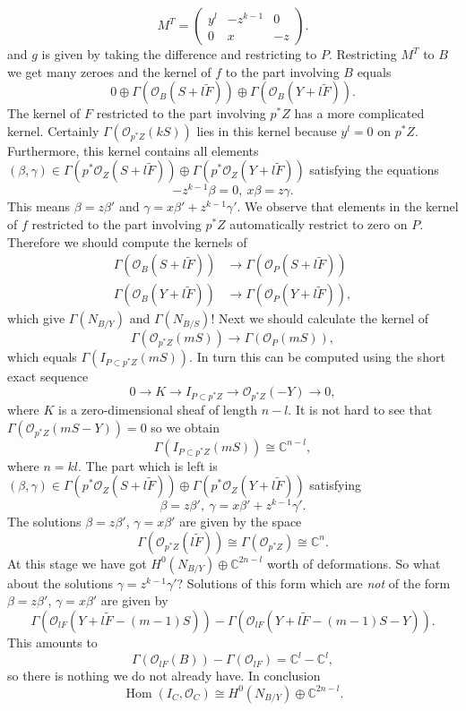 \documentclass{amsart}
\theoremstyle{definition}
\newcommand{\CC} {\mathbb{C}}          %
\renewcommand{\O}{\mathcal{O}}
\newcommand{\Hom}{\operatorname{Hom}}
\begin{document}
\[
M^T = \left( \begin{array}{ccc} y^l & -z^{k-1} & 0 \\ 0 & x & -z  \end{array} \right).
\]
and $g$ is given by taking the difference and restricting to $P$. Restricting $M^T$ to $B$ we get many zeroes and the kernel of $f$ to the part involving $B$ equals
\[
0 \oplus \Gamma(\O_B(S+l \tilde{F})) \oplus \Gamma(\O_B(Y + l \tilde{F})).
\]
The kernel of $F$ restricted to the part involving $p^*Z$ has a more complicated kernel. Certainly $\Gamma(\O_{p^*Z}(kS))$ lies in this kernel because $y^l = 0$ on $p^*Z$. Furthermore, this kernel contains all elements 
$(\beta,\gamma) \in \Gamma(p^*\O_Z(S+l\tilde{F})) \oplus \Gamma(p^*\O_Z(Y+l\tilde{F}))$ satisfying the equations
\[
-z^{k-1} \beta = 0, \ x\beta = z\gamma.
\]
This means $\beta = z \beta'$ and $\gamma = x\beta'+z^{k-1}\gamma'$. We observe that elements in the kernel of $f$ restricted to the part involving $p^*Z$ automatically restrict to zero on $P$. Therefore we should compute the kernels of 
\begin{align*}
\Gamma(\O_B(S+l \tilde{F})) &\rightarrow \Gamma(\O_P(S+l\tilde{F})) \\
\Gamma(\O_B(Y + l \tilde{F})) &\rightarrow \Gamma(\O_P(Y + l \tilde{F})),
\end{align*}
which give $\Gamma(N_{B/Y})$ and $\Gamma(N_{B/S})$! Next we should calculate the kernel of 
\[
\Gamma(\O_{p^*Z}(mS)) \rightarrow \Gamma(\O_P(mS)),
\]
which equals $\Gamma(I_{P \subset p^* Z}(mS))$. In turn this can be computed using the short exact sequence
\[
0 \rightarrow K \rightarrow I_{P \subset p^* Z} \rightarrow \O_{p^*Z}(-Y) \rightarrow 0, 
\]
where $K$ is a zero-dimensional sheaf of length $n-l$. It is not hard to see that $\Gamma(\O_{p^*Z}(mS-Y)) = 0$ so we obtain 
\[
\Gamma(I_{P \subset p^* Z}(mS)) \cong \CC^{n-l},
\]
where $n = kl$. The part which is left is $(\beta,\gamma) \in \Gamma(p^*\O_Z(S+l\tilde{F})) \oplus \Gamma(p^*\O_Z(Y+l\tilde{F}))$ satisfying
\[
\beta = z \beta', \ \gamma = x\beta'+z^{k-1}\gamma'.
\]
The solutions $\beta = z \beta'$, $\gamma = x\beta'$ are given by the space
\[
\Gamma(\O_{p^*Z}(l \tilde{F})) \cong \Gamma(\O_{p^*Z}) \cong \CC^{n}.
\]
At this stage we have got $H^0(N_{B/Y}) \oplus \CC^{2n-l}$ worth of deformations. So what about the solutions $\gamma = z^{k-1} \gamma'$? Solutions of this form which are \emph{not} of the form $\beta = z \beta'$, $\gamma = x\beta'$ are given by
\[
\Gamma(\O_{lF}(Y + l \tilde{F} - (m-1)S)) - \Gamma(\O_{lF}(Y + l \tilde{F} - (m-1)S - Y)).
\]
This amounts to
\[
\Gamma(\O_{lF}(B)) - \Gamma(\O_{lF}) = \CC^l - \CC^l,
\]
so there is nothing we do not already have. In conclusion
\[
\Hom(I_C,\O_C) \cong H^0(N_{B/Y}) \oplus \CC^{2n-l}.
\]
\end{document}
